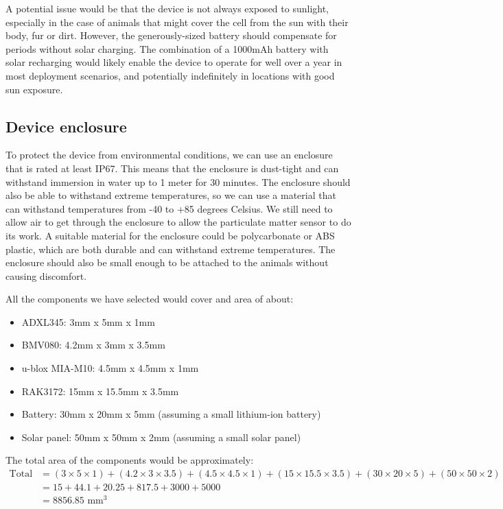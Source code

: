 A potential issue would be that the device is not always exposed to sunlight, especially in the case of animals that might cover the cell from the sun with their body, fur or dirt. However, the generously-sized battery should compensate for periods without solar charging. The combination of a 1000mAh battery with solar recharging would likely enable the device to operate for well over a year in most deployment scenarios, and potentially indefinitely in locations with good sun exposure.

\subsection{Device enclosure}
To protect the device from environmental conditions, we can use an enclosure that is rated at least IP67. This means that the enclosure is dust-tight and can withstand immersion in water up to 1 meter for 30 minutes. The enclosure should also be able to withstand extreme temperatures, so we can use a material that can withstand temperatures from -40 to +85 degrees Celsius. We still need to allow air to get through the enclosure to allow the particulate matter sensor to do its work. A suitable material for the enclosure could be polycarbonate or ABS plastic, which are both durable and can withstand extreme temperatures. The enclosure should also be small enough to be attached to the animals without causing discomfort.

All the components we have selected would cover and area of about:

\begin{itemize}
  \item ADXL345: 3mm x 5mm x 1mm
  \item BMV080: 4.2mm x 3mm x 3.5mm
  \item u-blox MIA-M10: 4.5mm x 4.5mm x 1mm
  \item RAK3172: 15mm x 15.5mm x 3.5mm
  \item Battery: 30mm x 20mm x 5mm (assuming a small lithium-ion battery)
  \item Solar panel: 50mm x 50mm x 2mm (assuming a small solar panel)
\end{itemize}

The total area of the components would be approximately:
\begin{align*}
\text{Total area} &= (3 \times 5 \times 1) + (4.2 \times 3 \times 3.5) + (4.5 \times 4.5 \times 1) + (15 \times 15.5 \times 3.5) + (30 \times 20 \times 5) + (50 \times 50 \times 2)\\
&= 15 + 44.1 + 20.25 + 817.5 + 3000 + 5000 \\
&= 8856.85 \text{ mm}^3
\end{align*}

